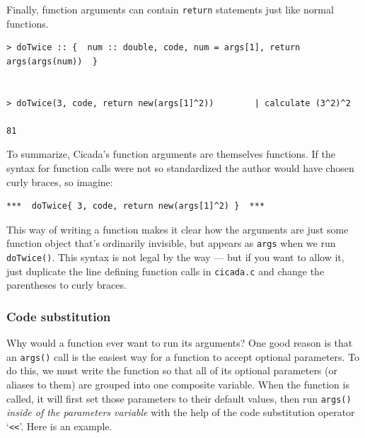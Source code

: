 \documentclass{article}
\newenvironment{code}{
       \begin{list}{}{
               \setlength{\leftmargin}{.4in}
               \setlength{\rightmargin}{0in}
               \setlength{\topsep}{.2in}
       }
       \small
       \item[] }
       { \end{list}   }
\begin{document}
Finally, function arguments can contain \verb#return# statements just like normal functions.

\begin{code} \begin{verbatim}
> doTwice :: {  num :: double, code, num = args[1], return args(args(num))  }


> doTwice(3, code, return new(args[1]^2))        | calculate (3^2)^2

81
\end{verbatim} \end{code}

To summarize, Cicada's function arguments are themselves functions.  If the syntax for function calls were not so standardized the author would have chosen curly braces, so imagine:

\begin{code} \begin{verbatim}
***  doTwice{ 3, code, return new(args[1]^2) }  ***
\end{verbatim} \end{code}

\noindent This way of writing a function makes it clear how the arguments are just some function object that's ordinarily invisible, but appears as \verb#args# when we run \verb#doTwice()#.  This syntax is not legal by the way --- but if you want to allow it, just duplicate the line defining function calls in \verb#cicada.c# and change the parentheses to curly braces.

 





\subsubsection{Code substitution}

Why would a function ever want to run its arguments?  One good reason is that an \verb#args()# call is the easiest way for a function to accept optional parameters.  To do this, we must write the function so that all of its optional parameters (or aliases to them) are grouped into one composite variable.  When the function is called, it will first set those parameters to their default values, then run \verb#args()# \emph{inside of the parameters variable} with the help of the code substitution operator `\verb#<<#'.  Here is an example.
\end{document}
